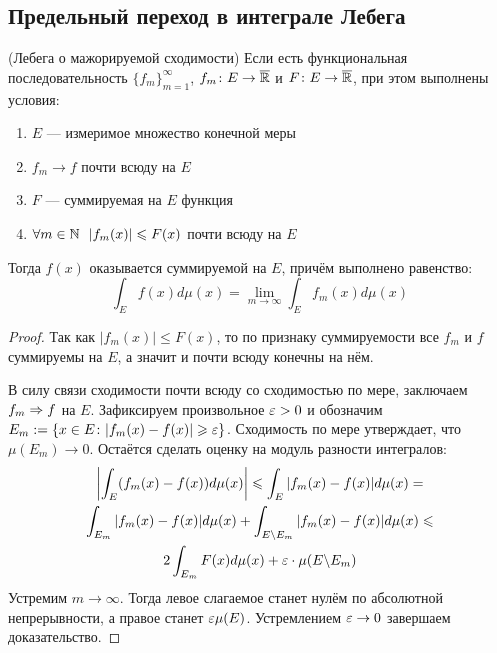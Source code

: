 \subsection{Предельный переход в интеграле Лебега}

\begin{theorem} (Лебега о мажорируемой сходимости)
	Если есть функциональная последовательность $\{f_m\}_{m = 1}^\infty$, $f_m \colon E \to \overline{\mathbb{R}}$ и $F \colon E \to \overline{\mathbb{R}}$, при этом выполнены условия:
	\begin{enumerate}
		\item $E$ --- измеримое множество конечной меры
		
		\item $f_m \to f$ почти всюду на $E$
		
		\item $F$ --- суммируемая на $E$ функция
		
		\item $\forall m \in \mathbb{N}\ \ |f_m(x)| \leqslant F(x)$ почти всюду на $E$
	\end{enumerate}
	Тогда $f(x)$ оказывается суммируемой на $E$, причём выполнено равенство:
	\[
		\int_E f(x)d\mu(x) = \lim_{m \to \infty} \int_E f_m(x)d\mu(x)
	\]
\end{theorem}

\begin{proof}
	Так как $|f_m(x)| \le F(x)$, то по признаку суммируемости все $f_m$ и $f$ суммируемы на $E$, а значит и почти всюду конечны на нём.
	
	В силу связи сходимости почти всюду со сходимостью по мере, заключаем $f_m \Rightarrow f$ на $E$. Зафиксируем произвольное $\varepsilon > 0$ и обозначим $E_m := \{x \in E \colon |f_m(x) - f(x)| \geqslant \varepsilon\}$. Сходимость по мере утверждает, что $\mu(E_m) \to 0$. Остаётся сделать оценку на модуль разности интегралов:
	\begin{multline*}
		\left|\int_E (f_m(x) - f(x))d\mu(x)\right| \leqslant \int_E |f_m(x) - f(x)|d\mu(x) =
		\\
		\int_{E_m} |f_m(x) - f(x)|d\mu(x) + \int_{E \backslash E_m} |f_m(x) - f(x)|d\mu(x) \leqslant
		\\
		2 \int_{E_m} F(x)d\mu(x) + \varepsilon \cdot \mu(E \backslash E_m)
	\end{multline*}
	Устремим $m \to \infty$. Тогда левое слагаемое станет нулём по абсолютной непрерывности, а правое станет $\varepsilon\mu(E)$. Устремлением $\varepsilon \to 0$ завершаем доказательство.
\end{proof}

